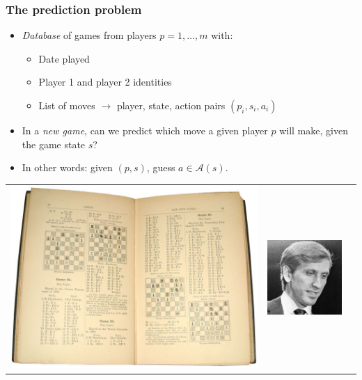 \documentclass{beamer}
\begin{document}
\begin{frame}
\frametitle{The prediction problem}
\begin{itemize}
\item \emph{Database} of games from players $p = 1,\hdots, m$ with:
\begin{itemize}
\item Date played
\item Player 1 and player 2 identities
\item List of moves $\to$ player, state, action pairs $(p_i, s_i, a_i)$
\end{itemize}
\item In a \emph{new game}, can we predict which move a given player $p$ will make, given the game state $s$?
\item In other words: given $(p, s)$, guess $a \in \mathcal{A}(s)$.
\end{itemize}
\begin{tabular}{ccc}
\includegraphics[scale = 0.1]{chessbook.jpg}&
\includegraphics[scale = 0.25]{fisher.jpeg}&

\end{tabular}
\end{frame}
\end{document}
